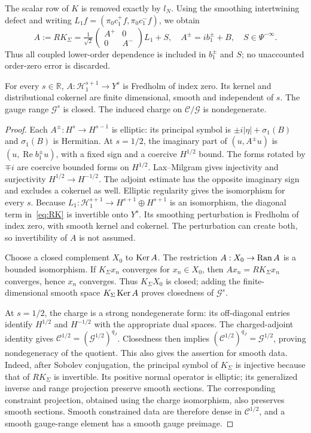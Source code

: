 The scalar row of $K$ is removed exactly by $l_N$.
Using the smoothing intertwining defect and writing $L_1f=(\pi_0c_1^+f,\pi_0c_1^-f)$, we obtain
\begin{equation}\label{eq:RK}
A:=RK_\Sigma
=\tfrac1{\sqrt2}\begin{pmatrix}A^+&0\\0&A^-\end{pmatrix}L_1+S,
\quad A^\pm=i b_1^\pm+B,\quad S\in\Psi^{-\infty}.
\end{equation}
Thus all coupled lower-order dependence is included in $b_1^\pm$ and $S$; no unaccounted order-zero error is discarded.

\begin{proposition}\label{prop:fredholm}
For every $s\in\mathbb R$, $A:\mathcal H_1^{s+1}\to Y^s$ is Fredholm of index zero.
Its kernel and distributional cokernel are finite dimensional, smooth and independent of $s$.
The gauge range $\mathcal G^s$ is closed.
The induced charge on $\mathcal C/\mathcal G$ is nondegenerate.
\end{proposition}
\begin{proof}
Each $A^\pm:H^s\to H^{s-1}$ is elliptic: its principal symbol is $\pm i|\eta|+\sigma_1(B)$ and $\sigma_1(B)$ is Hermitian.
At $s=1/2$, the imaginary part of $(u,A^\pm u)$ is $(u,\operatorname{Re}b_1^\pm u)$, with a fixed sign and a coercive $H^{1/2}$ bound.
The forms rotated by $\mp i$ are coercive bounded forms on $H^{1/2}$.
Lax--Milgram gives injectivity and surjectivity $H^{1/2}\to H^{-1/2}$.
The adjoint estimate has the opposite imaginary sign and excludes a cokernel as well.
Elliptic regularity gives the isomorphism for every $s$.
Because $L_1:\mathcal H_1^{s+1}\to H^{s+1}\oplus H^{s+1}$ is an isomorphism, the diagonal term in~\eqref{eq:RK} is invertible onto $Y^s$.
Its smoothing perturbation is Fredholm of index zero, with smooth kernel and cokernel.
The perturbation can create both, so invertibility of $A$ is not assumed.

Choose a closed complement $X_0$ to $\operatorname{Ker} A$.
The restriction $A:X_0\to\operatorname{Ran} A$ is a bounded isomorphism.
If $K_\Sigma x_n$ converges for $x_n\in X_0$, then $Ax_n=RK_\Sigma x_n$ converges, hence $x_n$ converges.
Thus $K_\Sigma X_0$ is closed; adding the finite-dimensional smooth space $K_\Sigma\operatorname{Ker} A$ proves closedness of $\mathcal G^s$.

At $s=1/2$, the charge is a strong nondegenerate form: its off-diagonal entries identify $H^{1/2}$ and $H^{-1/2}$ with the appropriate dual spaces.
The charged-adjoint identity gives $\mathcal C^{1/2}=(\mathcal G^{1/2})^{q_J}$.
Closedness then implies $(\mathcal C^{1/2})^{q_J}=\mathcal G^{1/2}$, proving nondegeneracy of the quotient.
This also gives the assertion for smooth data.
Indeed, after Sobolev conjugation, the principal symbol of $K_\Sigma$ is injective because that of $RK_\Sigma$ is invertible.
Its positive normal operator is elliptic; its generalized inverse and range projection preserve smooth sections.
The corresponding constraint projection, obtained using the charge isomorphism, also preserves smooth sections.
Smooth constrained data are therefore dense in $\mathcal C^{1/2}$, and a smooth gauge-range element has a smooth gauge preimage.
\end{proof}

